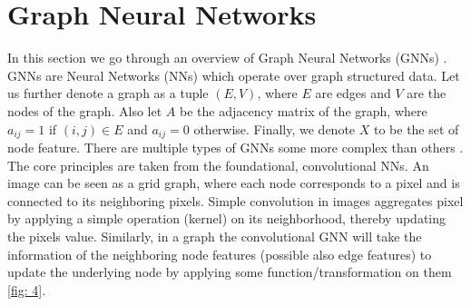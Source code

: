 \section{Graph Neural Networks}
In this section we go through an overview of Graph Neural Networks (GNNs)
\cite{gnn_overview}. GNNs are Neural Networks (NNs) which operate over graph
structured data. Let us further denote a graph as a tuple $(E, V)$, where $E$
are edges and $V$ are the nodes of the graph. Also let $A$ be the adjacency
matrix of the graph, where $a_{ij} = 1$ if $(i, j) \in E$ and $a_{ij} =0$
otherwise. Finally, we denote $X$ to be the set of node feature.
\newline
There are multiple types of GNNs some more complex than others
\cite{gnn_overview}. The core principles are taken from the foundational,
convolutional NNs. An image can be seen as a grid graph, where each node
corresponds to a pixel and is connected to its neighboring pixels. Simple
convolution in images aggregates pixel by applying a simple operation
(kernel) on its neighborhood, thereby updating the pixels value. Similarly,
in a graph the convolutional GNN will take the information of the neighboring
node features (possible also edge features) to update the underlying node by
applying some function/transformation on them \ref{fig: 4}.
